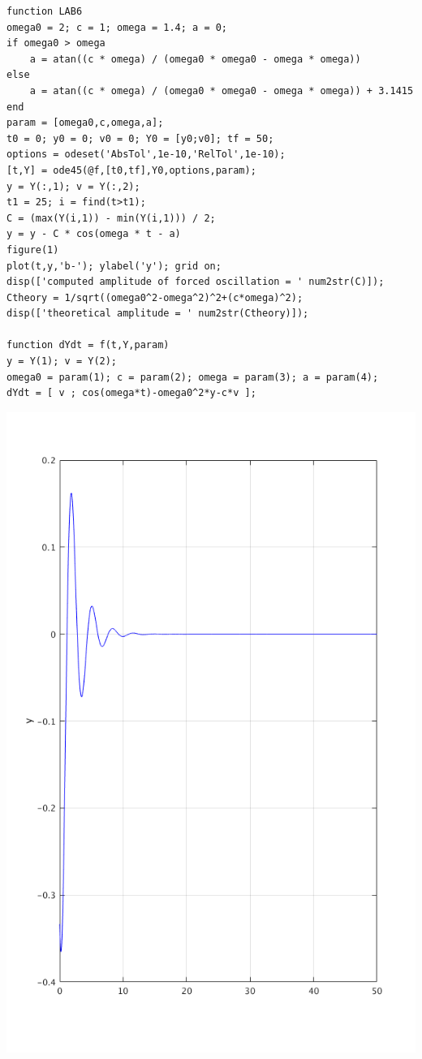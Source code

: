 \begin{verbatim}
function LAB6
omega0 = 2; c = 1; omega = 1.4; a = 0;
if omega0 > omega
    a = atan((c * omega) / (omega0 * omega0 - omega * omega))
else
    a = atan((c * omega) / (omega0 * omega0 - omega * omega)) + 3.1415
end
param = [omega0,c,omega,a];
t0 = 0; y0 = 0; v0 = 0; Y0 = [y0;v0]; tf = 50;
options = odeset('AbsTol',1e-10,'RelTol',1e-10);
[t,Y] = ode45(@f,[t0,tf],Y0,options,param);
y = Y(:,1); v = Y(:,2);
t1 = 25; i = find(t>t1);
C = (max(Y(i,1)) - min(Y(i,1))) / 2;
y = y - C * cos(omega * t - a)
figure(1)
plot(t,y,'b-'); ylabel('y'); grid on;
disp(['computed amplitude of forced oscillation = ' num2str(C)]);
Ctheory = 1/sqrt((omega0^2-omega^2)^2+(c*omega)^2);
disp(['theoretical amplitude = ' num2str(Ctheory)]);

function dYdt = f(t,Y,param)
y = Y(1); v = Y(2);
omega0 = param(1); c = param(2); omega = param(3); a = param(4);
dYdt = [ v ; cos(omega*t)-omega0^2*y-c*v ];

\end{verbatim}

\includegraphics[scale=0.4]{1.png}
